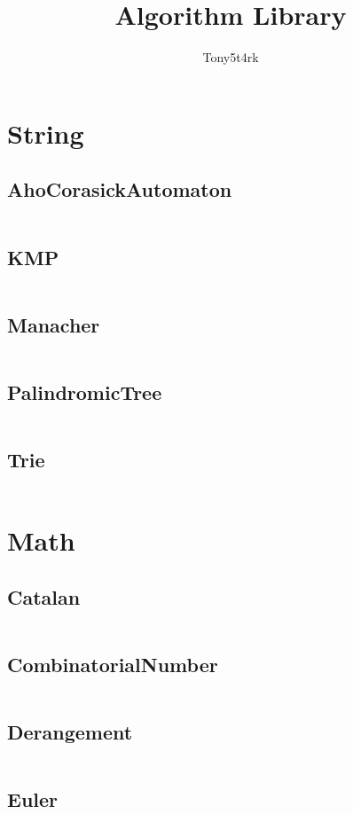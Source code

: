 \documentclass[a4paper,11pt]{article}
\author{Tony5t4rk}
\title{Algorithm Library}
\begin{document}
 
\maketitle
\newpage
\tableofcontents
\newpage

\section{String}
\subsection{AhoCorasickAutomaton}
\inputminted[breaklines]{c++}{01++String/+AhoCorasickAutomaton.cpp}
\subsection{KMP}
\inputminted[breaklines]{c++}{01++String/+KMP.cpp}
\subsection{Manacher}
\inputminted[breaklines]{c++}{01++String/+Manacher.cpp}
\subsection{PalindromicTree}
\inputminted[breaklines]{c++}{01++String/+PalindromicTree.cpp}
\subsection{Trie}
\inputminted[breaklines]{c++}{01++String/+Trie.cpp}

\newpage
\section{Math}
\subsection{Catalan}
\inputminted[breaklines]{c++}{02++Math/+Catalan.cpp}
\subsection{CombinatorialNumber}
\inputminted[breaklines]{c++}{02++Math/+CombinatorialNumber.cpp}
\subsection{Derangement}
\inputminted[breaklines]{c++}{02++Math/+Derangement.cpp}
\subsection{Euler}
\end{document}

